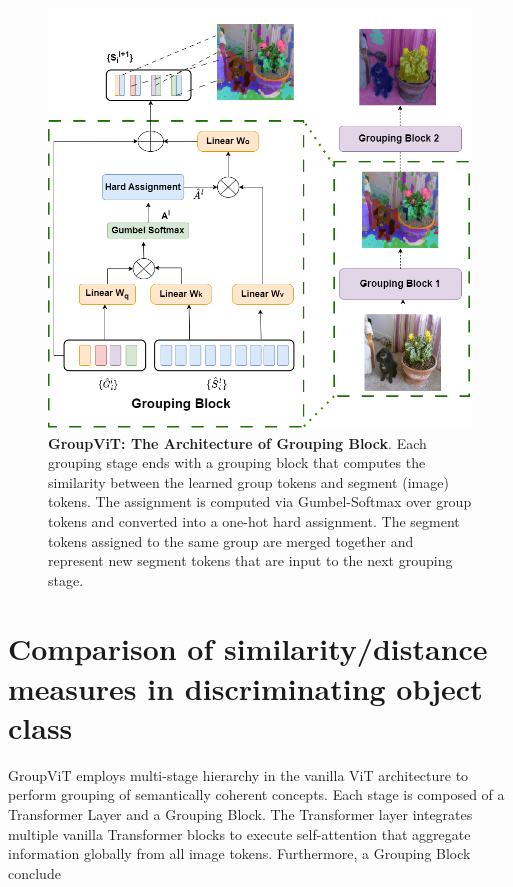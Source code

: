 \begin{figure}[t!]
  \centering
  \includegraphics[width=1\textwidth]{Images/GB.drawio (2).drawio (3).png}
  \caption[\textbf{GroupViT: The Architecture of Grouping Block}]{\textbf{GroupViT: The Architecture of Grouping Block}. Each grouping stage
ends with a grouping block that computes the similarity between the learned group tokens and segment (image) tokens. The assignment is
computed via Gumbel-Softmax over group tokens and converted into a one-hot hard assignment. The segment tokens assigned to the same
group are merged together and represent new segment tokens that are input to the next grouping stage.
 }
  \label{fig:groupingblock}
\end{figure}

\label{sec:gvitarch}

\section{Comparison of similarity/distance measures in discriminating object class}
\label{sec:comparison_same_vs_diff_class}
GroupViT employs multi-stage hierarchy in the vanilla ViT architecture to perform grouping of semantically coherent concepts. Each stage is composed of a Transformer Layer and a Grouping Block. The Transformer layer integrates multiple vanilla Transformer blocks \cite{vaswani2017attention}\cite{dosovitskiy2020image} to execute self-attention that aggregate information globally from all image tokens. Furthermore, a Grouping Block conclude

